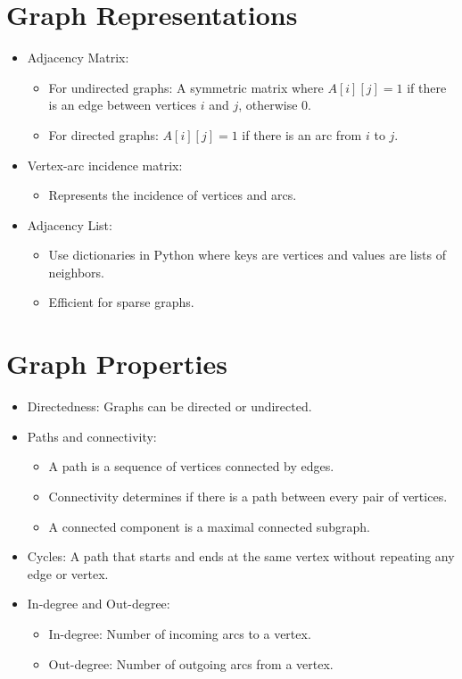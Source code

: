 \documentclass{article}
\begin{document}
\section*{Graph Representations}
\begin{itemize}
    \item Adjacency Matrix:
    \begin{itemize}
        \item For undirected graphs: A symmetric matrix where \( A[i][j] = 1 \) if there is an edge between vertices \( i \) and \( j \), otherwise \( 0 \).
        \item For directed graphs: \( A[i][j] = 1 \) if there is an arc from \( i \) to \( j \).
    \end{itemize}
    \item Vertex-arc incidence matrix:
    \begin{itemize}
        \item Represents the incidence of vertices and arcs.
    \end{itemize}
    \item Adjacency List:
    \begin{itemize}
        \item Use dictionaries in Python where keys are vertices and values are lists of neighbors.
        \item Efficient for sparse graphs.
    \end{itemize}
\end{itemize}

\section*{Graph Properties}
\begin{itemize}
    \item Directedness: Graphs can be directed or undirected.
    \item Paths and connectivity:
    \begin{itemize}
        \item A path is a sequence of vertices connected by edges.
        \item Connectivity determines if there is a path between every pair of vertices.
        \item A connected component is a maximal connected subgraph.
    \end{itemize}
    \item Cycles: A path that starts and ends at the same vertex without repeating any edge or vertex.
    \item In-degree and Out-degree:
    \begin{itemize}
        \item In-degree: Number of incoming arcs to a vertex.
        \item Out-degree: Number of outgoing arcs from a vertex.
    \end{itemize}
\end{itemize}
\end{document}
